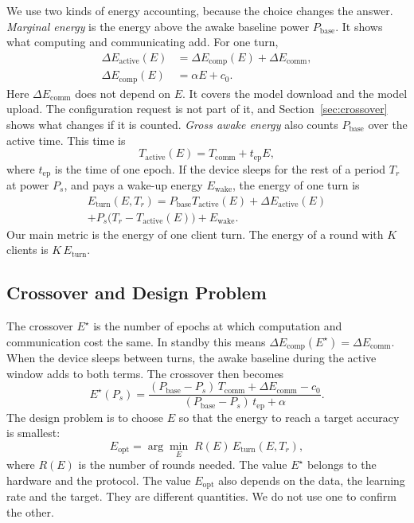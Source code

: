 \documentclass[journal]{IEEEtran}
\newcommand{\Pbase}{P_{\mathrm{base}}}
\newcommand{\Estar}{E^{\star}}
\begin{document}
We use two kinds of energy accounting, because the choice changes the answer. \emph{Marginal energy} is the energy above the awake baseline power $\Pbase$. It shows what computing and communicating add. For one turn,
\begin{align}
\Delta E_{\mathrm{active}}(E)&=\Delta E_{\mathrm{comp}}(E)+\Delta E_{\mathrm{comm}},\\
\Delta E_{\mathrm{comp}}(E)&=\alpha E+c_0 .
\label{eq:marginal}
\end{align}
Here $\Delta E_{\mathrm{comm}}$ does not depend on $E$. It covers the model download and the model upload. The configuration request is not part of it, and Section~\ref{sec:crossover} shows what changes if it is counted. \emph{Gross awake energy} also counts $\Pbase$ over the active time. This time is
\begin{equation}
T_{\mathrm{active}}(E)=T_{\mathrm{comm}}+t_{\mathrm{ep}}E,
\end{equation}
where $t_{\mathrm{ep}}$ is the time of one epoch. If the device sleeps for the rest of a period $T_r$ at power $P_s$, and pays a wake-up energy $E_{\mathrm{wake}}$, the energy of one turn is
\begin{multline}
E_{\mathrm{turn}}(E,T_r)=\Pbase T_{\mathrm{active}}(E)+\Delta E_{\mathrm{active}}(E)\\
+P_s\bigl(T_r-T_{\mathrm{active}}(E)\bigr)+E_{\mathrm{wake}} .
\label{eq:eturn}
\end{multline}
Our main metric is the energy of one client turn. The energy of a round with $K$ clients is $K\,E_{\mathrm{turn}}$.

\subsection{Crossover and Design Problem}
The crossover $\Estar$ is the number of epochs at which computation and communication cost the same. In standby this means $\Delta E_{\mathrm{comp}}(\Estar)=\Delta E_{\mathrm{comm}}$. When the device sleeps between turns, the awake baseline during the active window adds to both terms. The crossover then becomes
\begin{equation}
\Estar(P_s)=\frac{(\Pbase-P_s)\,T_{\mathrm{comm}}+\Delta E_{\mathrm{comm}}-c_0}{(\Pbase-P_s)\,t_{\mathrm{ep}}+\alpha}.
\label{eq:unified}
\end{equation}
The design problem is to choose $E$ so that the energy to reach a target accuracy is smallest:
\begin{equation}
E_{\mathrm{opt}}=\arg\min_{E}\; R(E)\,E_{\mathrm{turn}}(E,T_r),
\label{eq:eopt}
\end{equation}
where $R(E)$ is the number of rounds needed. The value $\Estar$ belongs to the hardware and the protocol. The value $E_{\mathrm{opt}}$ also depends on the data, the learning rate and the target. They are different quantities. We do not use one to confirm the other.
\end{document}
